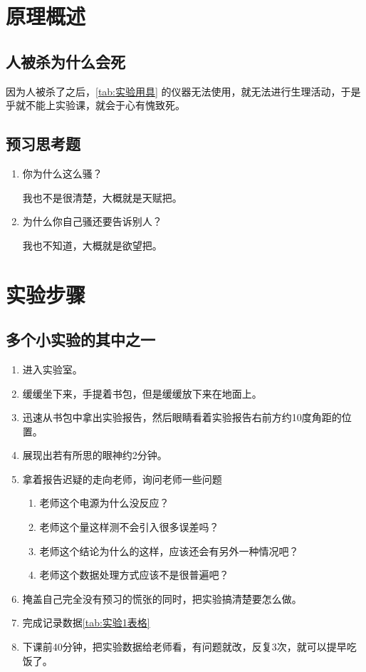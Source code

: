 \documentclass[no-math,zihao = -4]{ctexart} %
\begin{document}
\section{原理概述}
    \subsection{人被杀为什么会死}
        因为人被杀了之后，\autoref{tab:实验用具} 的仪器无法使用，就无法进行生理活动，于是乎就不能上实验课，就会于心有愧致死。

    \subsection{预习思考题}
        \begin{enumerate}
            \item 你为什么这么骚？
            \begin{ans}
                我也不是很清楚，大概就是天赋把。
            \end{ans}

            \item 为什么你自己骚还要告诉别人？
            \begin{ans}
                我也不知道，大概就是欲望把。
            \end{ans}
        \end{enumerate}
\section{实验步骤}
    \subsection{多个小实验的其中之一}
        \begin{enumerate}
            \item 进入实验室。
            \item 缓缓坐下来，手提着书包，但是缓缓放下来在地面上。
            \item 迅速从书包中拿出实验报告，然后眼睛看着实验报告右前方约10度角距的位置。
            \item 展现出若有所思的眼神约2分钟。
            \item 拿着报告迟疑的走向老师，询问老师一些问题
                \begin{enumerate}
                    \item 老师这个电源为什么没反应？
                    \item 老师这个量这样测不会引入很多误差吗？
                    \item 老师这个结论为什么的这样，应该还会有另外一种情况吧？
                    \item 老师这个数据处理方式应该不是很普遍吧？
                \end{enumerate}
            \item 掩盖自己完全没有预习的慌张的同时，把实验搞清楚要怎么做。
            \item 完成记录数据\autoref{tab:实验1表格}
            \item 下课前40分钟，把实验数据给老师看，有问题就改，反复3次，就可以提早吃饭了。
        \end{enumerate}
\end{document}
